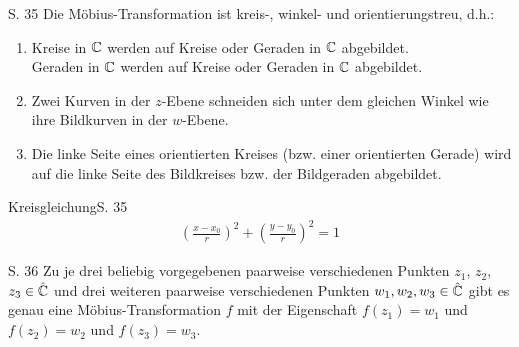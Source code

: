 \begin{satz}{S. 35}
  Die Möbius-Transformation ist kreis-, winkel- und orientierungstreu, d.h.:
  \begin{enumerate}[label=\alph*)]
    \item Kreise \tabto{1.2cm} in $\mathbb{C}$ werden auf Kreise oder Geraden in $\mathbb{C}$ abgebildet.\\
      Geraden \tabto{1.2cm} in $\mathbb{C}$ werden auf Kreise oder Geraden in $\mathbb{C}$ abgebildet.
    \item Zwei Kurven in der $z$-Ebene schneiden sich unter dem gleichen Winkel wie ihre Bildkurven in der $w$-Ebene.
    \item Die linke Seite eines orientierten Kreises (bzw. einer orientierten Gerade) wird auf die linke Seite des Bildkreises bzw. der Bildgeraden abgebildet.
  \end{enumerate}
\end{satz}

\begin{bemerkung}{Kreisgleichung}{S. 35}
  \vspace{-\baselineskip}
  \begin{align}
     \left( \frac{x - x_0}{r} \right)^2 + \left( \frac{y - y_0}{r} \right)^2 = 1
  \end{align}
\end{bemerkung}

\begin{satz}{S. 36}
  Zu je drei beliebig vorgegebenen paarweise verschiedenen Punkten $z_1$, $z_2$, $z_3 \in \hat{\mathbb{C}}$ und drei weiteren paarweise verschiedenen Punkten $w_1, w_2, w_3 \in \hat{\mathbb{C}}$ gibt es genau eine Möbius-Transformation $f$ mit der Eigenschaft $f(z_1) = w_1$ und $f(z_2) = w_2$ und $f(z_3) = w_3$.
\end{satz}

